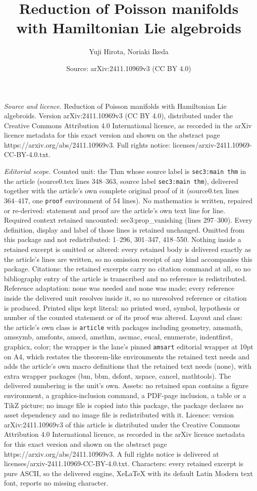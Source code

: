 \documentclass[10pt,a4paper]{amsart}
\title[Reduction of Poisson manifolds with Hamiltonian Lie algebroi]{Reduction of Poisson manifolds with Hamiltonian Lie algebroids}
\author{Yuji Hirota, Noriaki Ikeda}
\date{Source: arXiv:2411.10969v3 (CC BY 4.0)}
\begin{document}
\maketitle

\noindent\emph{Source and licence.} Reduction of Poisson manifolds with Hamiltonian Lie algebroids. Version arXiv:2411.10969v3 (CC BY 4.0), distributed under the Creative Commons Attribution 4.0 International licence, as recorded in the arXiv licence metadata for this exact version and shown on the abstract page https://arxiv.org/abs/2411.10969v3. Full rights notice: licenses/arxiv-2411.10969-CC-BY-4.0.txt.\par\smallskip

\noindent\textit{Editorial scope.} Counted unit: the Thm whose source label is \texttt{sec3:main thm} in the article (source0.tex lines 348--363, source label \texttt{sec3:main thm}), delivered together with the article's own complete original proof of it (source0.tex lines 364--417, one \texttt{proof} environment of 54 lines). No mathematics is written, repaired or re-derived: statement and proof are the article's own text line for line. Required context retained uncounted: sec3:prop\_vanishing (lines 297--300). Every definition, display and label of those lines is retained unchanged. Omitted from this package and not redistributed: 1--296, 301--347, 418--550. Nothing inside a retained excerpt is omitted or altered: every retained body is delivered exactly as the article's lines are written, so no omission receipt of any kind accompanies this package. Citations: the retained excerpts carry no citation command at all, so no bibliography entry of the article is transcribed and no reference is redistributed. Reference adaptation: none was needed and none was made; every reference inside the delivered unit resolves inside it, so no unresolved reference or citation is produced. Printed slips kept literal: no printed word, symbol, hypothesis or number of the counted statement or of its proof was altered. Layout and class: the article's own class is \texttt{article} with packages including geometry, amsmath, amssymb, amsfonts, amscd, amsthm, ascmac, eucal, enumerate, indentfirst, graphicx, color; the wrapper is the lane's pinned \texttt{amsart} editorial wrapper at 10pt on A4, which restates the theorem-like environments the retained text needs and adds the article's own macro definitions that the retained text needs (none), with extra wrapper packages (bm, bbm, dsfont, xspace, cancel, mathtools). The delivered numbering is the unit's own. Assets: no retained span contains a figure environment, a graphics-inclusion command, a PDF-page inclusion, a table or a TikZ picture; no image file is copied into this package, the package declares no asset dependency and no image file is redistributed with it. Licence: version arXiv:2411.10969v3 of this article is distributed under the Creative Commons Attribution 4.0 International licence, as recorded in the arXiv licence metadata for this exact version and shown on the abstract page https://arxiv.org/abs/2411.10969v3. A full rights notice is delivered at licenses/arxiv-2411.10969-CC-BY-4.0.txt. Characters: every retained excerpt is pure ASCII, so the delivered engine, XeLaTeX with its default Latin Modern text font, reports no missing character.
\end{document}
